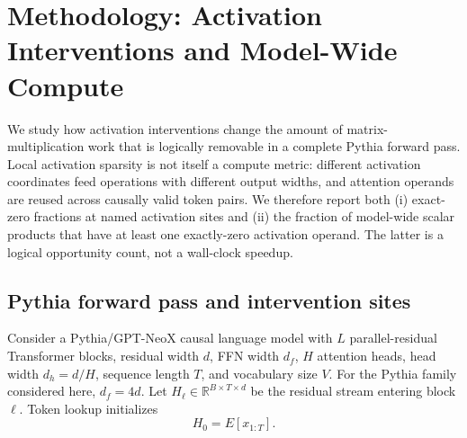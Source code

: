 %
%   
%
%

\providecommand{\R}{\mathbb{R}}
\providecommand{\ind}{\mathbf{1}}
\providecommand{\norm}[1]{\left\lVert #1\right\rVert}
\providecommand{\abs}[1]{\left\lvert #1\right\rvert}
\providecommand{\LN}{\operatorname{LN}}
\providecommand{\RoPE}{\operatorname{RoPE}}
\providecommand{\softmax}{\operatorname{softmax}}
\providecommand{\GELU}{\operatorname{GELU}}
\providecommand{\ReLU}{\operatorname{ReLU}}
\providecommand{\model}{\mathrm{model}}
\providecommand{\block}{\mathrm{block}}
\providecommand{\pre}{\mathrm{pre}}
\providecommand{\post}{\mathrm{post}}

\section{Methodology: Activation Interventions and Model-Wide Compute}
\label{sec:methodology}

We study how activation interventions change the amount of matrix-multiplication
work that is logically removable in a complete Pythia forward pass. Local
activation sparsity is not itself a compute metric: different activation
coordinates feed operations with different output widths, and attention
operands are reused across causally valid token pairs. We therefore report both
(i) exact-zero fractions at named activation sites and (ii) the fraction of
model-wide scalar products that have at least one exactly-zero activation
operand. The latter is a logical opportunity count, not a wall-clock speedup.

\subsection{Pythia forward pass and intervention sites}
\label{sec:forward-pass}

Consider a Pythia/GPT-NeoX causal language model with $L$ parallel-residual
Transformer blocks, residual width $d$, FFN width $d_f$, $H$ attention heads,
head width $d_h=d/H$, sequence length $T$, and vocabulary size $V$. For the
Pythia family considered here, $d_f=4d$. Let
$H_\ell\in\R^{B\times T\times d}$ be the residual stream entering block
$\ell$. Token lookup initializes
\begin{equation}
    H_0 = E[x_{1:T}].
    \label{eq:embedding}
\end{equation}

